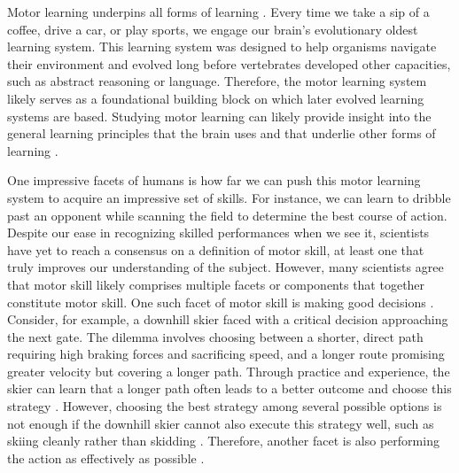 Motor learning underpins all forms of learning \cite{shadmehr_computational_2004}. Every time we take a sip of a coffee, drive a car, or play sports, we engage our brain's evolutionary oldest learning system. This learning system was designed to help organisms navigate their environment and evolved long before vertebrates developed other capacities, such as abstract reasoning or language. Therefore, the motor learning system likely serves as a foundational building block on which later evolved learning systems are based. Studying motor learning can likely provide insight into the general learning principles that the brain uses and that underlie other forms of learning \cite{shadmehr_computational_2004}.
 
One impressive facets of humans is how far we can push this motor learning system to acquire an impressive set of skills. For instance, we can learn to dribble past an opponent while scanning the field to determine the best course of action. Despite our ease in recognizing skilled performances when we see it,  scientists have yet to reach a consensus on a definition of motor skill, at least one that truly improves our understanding of the subject\cite{du_relationship_2022, shadmehr_computational_2004}. However, many scientists agree that motor skill likely comprises multiple facets or components that together constitute motor skill\cite{wolpert_principles_2011, wolpert_motor_2010, wolpert_perspectives_2001, du_relationship_2022, chen_effects_2018, diedrichsen_motor_2015, stanley_motor_2013, gallivan_decision-making_2018, krakauer_motor_2019, makino_circuit_2016}. One such facet of motor skill is making good decisions \cite{gallivan_decision-making_2018, du_relationship_2022, wolpert_motor_2010}. Consider, for example, a downhill skier faced with a critical decision approaching the next gate. The dilemma involves choosing between a shorter, direct path requiring high braking forces and sacrificing speed, and a longer route promising greater velocity but covering a longer path. Through practice and experience, the skier can learn that a longer path often leads to a better outcome and choose this strategy \cite{supej_differential_2008, lesnik_best_2007, federolf_quantifying_2012}. However, choosing the best strategy among several possible options is not enough if the downhill skier cannot also execute this strategy well, such as skiing cleanly rather than skidding \cite{reid_kinematic_2010, reid_turn_2009}. Therefore, another facet is also performing the action as effectively as possible \cite{du_relationship_2022, wolpert_perspectives_2001}.

